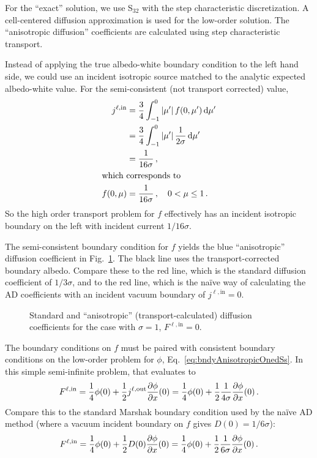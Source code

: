 For the ``exact'' solution, we use S$_{32}$ with the step characteristic
discretization. A cell-centered diffusion approximation is used for
the low-order solution. The ``anisotropic diffusion'' coefficients are
calculated using step characteristic transport.

\horizsep

Instead of applying the true albedo-white boundary condition to the
left hand side, we could use an incident isotropic source matched to the
analytic expected albedo-white value. For the semi-consistent (not transport
corrected) value,
\begin{align*}
  j^{\ell,\mathrm{in}} &= \frac{3}{4} \int_{-1}^{0} \left| \mu' \right| f(0, \mu') \mathop{}\!\mathrm{d}\mu' \\
  &= \frac{3}{4} \int_{-1}^{0} \left| \mu' \right| \frac{1}{2\sigma} \mathop{}\!\mathrm{d}\mu' \\
  &= \frac{1}{16\sigma} \,,
  \\ 
  \intertext{which corresponds to}
  f(0, \mu) &=  \frac{1}{16\sigma} \,,\quad 0 < \mu \le 1\,.
\end{align*}
So the high order transport problem for $f$ effectively has an incident
isotropic boundary on the left with incident current $1/16\sigma$.

The semi-consistent boundary condition for $f$ yields the blue ``anisotropic''
diffusion coefficient in
Fig.~\ref{fig:bndycondDcoeff}.  The black line uses the transport-corrected
boundary albedo.  Compare these to the red line, which is the
standard diffusion coefficient of $1/3\sigma$, and to the red line, which
is the na\"ive way of calculating the AD coefficients with an incident
vacuum boundary of $j^{\ell,\mathrm{in}}=0$.
\begin{figure}[htb]
  \centering
  
  \caption{Standard and ``anisotropic'' (transport-calculated) diffusion
  coefficients for the case with $\sigma=1$, $F^{\ell,\mathrm{in}}=0$.}
  \label{fig:bndycondDcoeff}
\end{figure}

The boundary conditions on $f$ must be paired with consistent boundary
conditions on the low-order problem for $\phi$,
Eq.~\eqref{eq:bndyAnisotropicOnedSs}. In this simple semi-infinite problem,
that evaluates to
\begin{equation*}
  F^{\ell,\mathrm{in}}
  = \frac{1}{4} \phi(0)
  + \frac{1}{2} j^{\ell,\mathrm{out}} \frac{\partial \phi}{\partial x}(0)
  = \frac{1}{4} \phi(0)
  + \frac{1}{2} \frac{1}{4\sigma} \frac{\partial \phi}{\partial x}(0) \,.
\end{equation*}
Compare this to the standard Marshak boundary condition used by the na\"ive AD
method (where a vacuum incident boundary on $f$ gives $D(0)=1/6\sigma$):
\begin{equation*}
  F^{\ell,\mathrm{in}}
  = \frac{1}{4} \phi(0)
  + \frac{1}{2} D(0) \frac{\partial \phi}{\partial x}(0)
  = \frac{1}{4} \phi(0)
  + \frac{1}{2} \frac{1}{6\sigma} \frac{\partial \phi}{\partial x}(0) \,.
\end{equation*}

